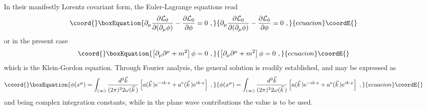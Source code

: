 \documentclass[a4paper,11pt]{article}
\begin{document}
In their manifestly Lorentz covariant form, the Euler-Lagrange equations read
\begin{equation}\coord{}\boxEquation{
\partial_\mu\frac{\partial{\cal L}_0}{\partial(\partial_\mu\phi)}-
\frac{\partial{\cal L}_0}{\partial\phi}=0\ ,
}{
\partial_\mu\frac{\partial{\cal L}_0}{\partial(\partial_\mu\phi)}-
\frac{\partial{\cal L}_0}{\partial\phi}=0\ ,
}{ecuacion}\coordE{}\end{equation}
or in the present case
\begin{equation}\coord{}\boxEquation{
\left[\partial_\mu\partial^\mu+m^2\right]\phi=0\ ,
}{
\left[\partial_\mu\partial^\mu+m^2\right]\phi=0\ ,
}{ecuacion}\coordE{}\end{equation}
which is the Klein-Gordon equation. Through Fourier analysis, the general
solution is readily established, and may be expressed as
\begin{equation}\coord{}\boxEquation{
\phi(x^\mu)=\int_{(\infty)}\frac{d^3\vec{k}}{(2\pi)^32\omega(\vec{k}\,)}
\left[a(\vec{k}\,)e^{-ik\cdot x}+a^*(\vec{k}\,)e^{ik\cdot x}\right]\ ,
\label{eq:solutionphi}
}{
\phi(x^\mu)=\int_{(\infty)}\frac{d^3\vec{k}}{(2\pi)^32\omega(\vec{k}\,)}
\left[a(\vec{k}\,)e^{-ik\cdot x}+a^*(\vec{k}\,)e^{ik\cdot x}\right]\ ,
}{ecuacion}\coordE{}\end{equation}
\coordHE{} and \coordHE{} being complex integration constants,
while in the plane wave contributions \coordHE{}
the value \coordHE{} is to be used.
\end{document}
